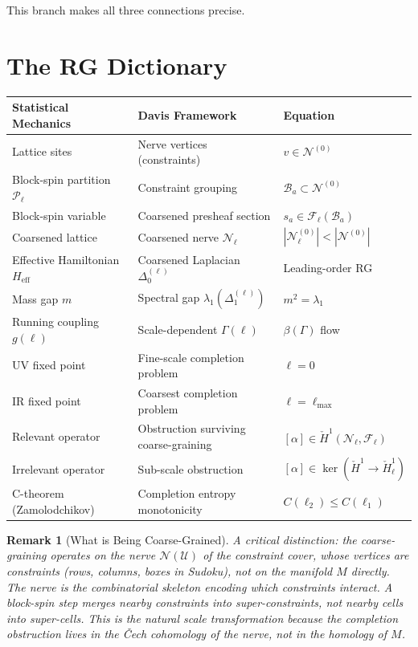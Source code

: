 \documentclass[11pt,letterpaper]{article}
\newtheorem{remark}[conjecture]{Remark}
\newcommand{\Hcech}{\check{H}}
\newcommand{\sheaf}{\mathcal{F}}
\newcommand{\cover}{\mathcal{U}}
\newcommand{\nerve}{\mathcal{N}}
\newcommand{\block}{\mathcal{B}}
\newcommand{\partition}{\mathcal{P}}
\begin{document}
This branch makes all three connections precise.

\section{The RG Dictionary}

\begin{center}
\renewcommand{\arraystretch}{1.4}
\begin{tabular}{lll}
\textbf{Statistical Mechanics} & \textbf{Davis Framework} 
& \textbf{Equation} \\
\hline
Lattice sites & Nerve vertices (constraints) 
& $v \in \nerve^{(0)}$ \\
Block-spin partition $\partition_\ell$ & Constraint grouping 
& $\block_a \subset \nerve^{(0)}$ \\
Block-spin variable & Coarsened presheaf section 
& $s_a \in \sheaf_\ell(\block_a)$ \\
Coarsened lattice & Coarsened nerve $\nerve_\ell$ 
& $|\nerve_\ell^{(0)}| < |\nerve^{(0)}|$ \\
Effective Hamiltonian $H_{\mathrm{eff}}$ & Coarsened Laplacian 
$\Delta_0^{(\ell)}$ & Leading-order RG \\
Mass gap $m$ & Spectral gap $\lambda_1(\Delta_1^{(\ell)})$ 
& $m^2 = \lambda_1$ \\
Running coupling $g(\ell)$ & Scale-dependent $\Gamma(\ell)$ 
& $\beta(\Gamma)$ flow \\
UV fixed point & Fine-scale completion problem 
& $\ell = 0$ \\
IR fixed point & Coarsest completion problem 
& $\ell = \ell_{\max}$ \\
Relevant operator & Obstruction surviving coarse-graining 
& $[\alpha] \in \Hcech^1(\nerve_\ell, \sheaf_\ell)$ \\
Irrelevant operator & Sub-scale obstruction 
& $[\alpha] \in \ker(\Hcech^1 \to \Hcech^1_\ell)$ \\
C-theorem (Zamolodchikov) & Completion entropy monotonicity 
& $C(\ell_2) \leq C(\ell_1)$ \\
\end{tabular}
\end{center}

\begin{remark}[What is Being Coarse-Grained]
A critical distinction: the coarse-graining operates on the 
\emph{nerve} $\nerve(\cover)$ of the constraint cover, whose 
vertices are \emph{constraints} (rows, columns, boxes in Sudoku), 
not on the manifold $M$ directly. The nerve is the combinatorial 
skeleton encoding which constraints interact. A block-spin step 
merges nearby \emph{constraints} into super-constraints, not 
nearby cells into super-cells. This is the natural scale 
transformation because the completion obstruction lives in the 
\v{C}ech cohomology of the nerve, not in the homology of $M$.
\end{remark}
\end{document}
